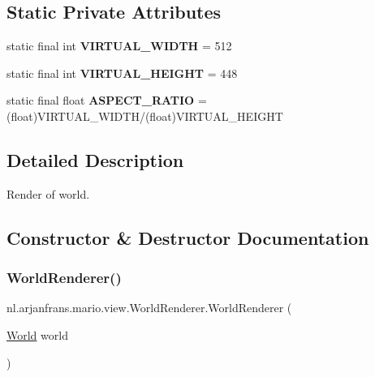 \subsection*{Static Private Attributes}
\begin{DoxyCompactItemize}
\item 
\mbox{\label{classnl_1_1arjanfrans_1_1mario_1_1view_1_1WorldRenderer_abcb78ea8c0477db3aa4fd48b651d6bd5}} 
static final int {\bfseries V\+I\+R\+T\+U\+A\+L\+\_\+\+W\+I\+D\+TH} = 512
\item 
\mbox{\label{classnl_1_1arjanfrans_1_1mario_1_1view_1_1WorldRenderer_a9823fdab35ee11e7fce194a0947e4833}} 
static final int {\bfseries V\+I\+R\+T\+U\+A\+L\+\_\+\+H\+E\+I\+G\+HT} = 448
\item 
\mbox{\label{classnl_1_1arjanfrans_1_1mario_1_1view_1_1WorldRenderer_afa106e71dbcc30e726ae1d3a211a0397}} 
static final float {\bfseries A\+S\+P\+E\+C\+T\+\_\+\+R\+A\+T\+IO} = (float)V\+I\+R\+T\+U\+A\+L\+\_\+\+W\+I\+D\+TH/(float)V\+I\+R\+T\+U\+A\+L\+\_\+\+H\+E\+I\+G\+HT
\end{DoxyCompactItemize}


\subsection{Detailed Description}
Render of world. 

\subsection{Constructor \& Destructor Documentation}
\mbox{\label{classnl_1_1arjanfrans_1_1mario_1_1view_1_1WorldRenderer_ae3b0ff5bd619324e74a6656c2a380fc1}} 
\subsubsection{\texorpdfstring{World\+Renderer()}{WorldRenderer()}}
{\footnotesize\ttfamily nl.\+arjanfrans.\+mario.\+view.\+World\+Renderer.\+World\+Renderer (\begin{DoxyParamCaption}\item[{\hyperlink{classnl_1_1arjanfrans_1_1mario_1_1model_1_1World}{World}}]{world }\end{DoxyParamCaption})}



